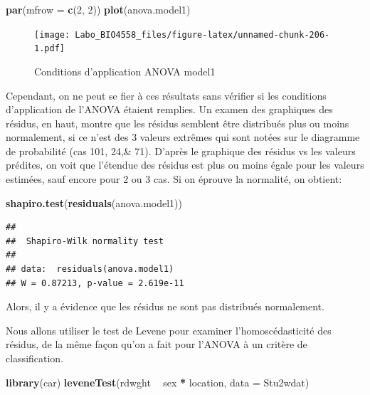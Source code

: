 \documentclass[12pt,]{book}
\newenvironment{Shaded}{\begin{snugshade}}{\end{snugshade}}
\newcommand{\DataTypeTok}[1]{\textcolor[rgb]{0.27,0.27,0.27}{#1}}
\newcommand{\DecValTok}[1]{\textcolor[rgb]{0.06,0.06,0.06}{#1}}
\newcommand{\KeywordTok}[1]{\textcolor[rgb]{0.27,0.27,0.27}{\textbf{#1}}}
\newcommand{\NormalTok}[1]{#1}
\newcommand{\OperatorTok}[1]{\textcolor[rgb]{0.43,0.43,0.43}{\textbf{#1}}}
\newcommand{\StringTok}[1]{\textcolor[rgb]{0.5,0.5,0.5}{#1}}
\begin{document}
\begin{Shaded}
\begin{Highlighting}[]
\KeywordTok{par}\NormalTok{(}\DataTypeTok{mfrow =} \KeywordTok{c}\NormalTok{(}\DecValTok{2}\NormalTok{, }\DecValTok{2}\NormalTok{))}
\KeywordTok{plot}\NormalTok{(anova.model1)}
\end{Highlighting}
\end{Shaded}

\begin{figure}
\centering
\texttt{[image: Labo\_BIO4558\_files/figure-latex/unnamed-chunk-206-1.pdf]}
\caption{\label{fig:unnamed-chunk-206}Conditions d'application ANOVA model1}
\end{figure}

Cependant, on ne peut se fier à ces résultats sans vérifier si les conditions d'application de l'ANOVA étaient remplies. Un examen des graphiques des résidus, en haut, montre que les résidus semblent être distribués plus ou moins normalement, si ce n'est des 3 valeurs extrêmes qui sont notées sur le diagramme de probabilité (cas 101, 24,\& 71). D'après le graphique des résidus vs les valeurs prédites, on voit que l'étendue des résidus est plus ou moins égale pour les valeurs estimées, sauf encore pour 2 ou 3 cas. Si on éprouve la normalité, on obtient:

\begin{Shaded}
\begin{Highlighting}[]
\KeywordTok{shapiro.test}\NormalTok{(}\KeywordTok{residuals}\NormalTok{(anova.model1))}
\end{Highlighting}
\end{Shaded}

\begin{verbatim}
## 
## 	Shapiro-Wilk normality test
## 
## data:  residuals(anova.model1)
## W = 0.87213, p-value = 2.619e-11
\end{verbatim}

Alors, il y a évidence que les résidus ne sont pas distribués normalement.

Nous allons utiliser le test de Levene pour examiner l'homoscédasticité des résidus, de la même façon qu'on a fait pour l'ANOVA à un critère de classification.

\begin{Shaded}
\begin{Highlighting}[]
\KeywordTok{library}\NormalTok{(car)}
\KeywordTok{leveneTest}\NormalTok{(rdwght }\OperatorTok{~}\StringTok{ }\NormalTok{sex }\OperatorTok{*}\StringTok{ }\NormalTok{location, }\DataTypeTok{data =}\NormalTok{ Stu2wdat)}
\end{Highlighting}
\end{Shaded}
\end{document}
